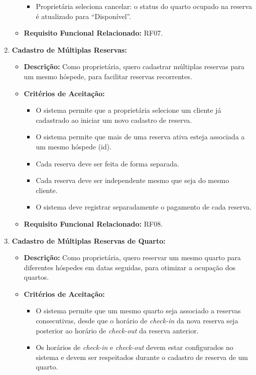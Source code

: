 \documentclass[
	12pt,				%
	openany,			%
	oneside,			%
	a4paper,			%
	english,			%
	french,				%
	spanish,			%
	brazil				%
	]{abntex2}
\begin{document}
\begin{enumerate}[label=\textbf{\arabic*.}]
\begin{itemize}
\begin{itemize}
			\item Proprietária seleciona cancelar: o status do quarto ocupado na reserva é atualizado para “Disponível”.
		\end{itemize}
		\item \textbf{Requisito Funcional Relacionado:} RF07.
	\end{itemize} 
	\item \textbf{Cadastro de Múltiplas Reservas:}
	\begin{itemize}
		\item \textbf{Descrição:} Como proprietária, quero cadastrar múltiplas reservas para um mesmo hóspede, para facilitar reservas recorrentes.
		\item \textbf{Critérios de Aceitação:}
		\begin{itemize}
			\item O sistema permite que a proprietária selecione um cliente já cadastrado ao iniciar um novo cadastro de reserva.
			\item O sistema permite que mais de uma reserva ativa esteja associada a um mesmo hóspede (id).
			\item Cada reserva deve ser feita de forma separada.
			\item Cada reserva deve ser independente mesmo que seja do mesmo cliente.
			\item O sistema deve registrar separadamente o pagamento de cada reserva.
		\end{itemize}
		\item \textbf{Requisito Funcional Relacionado:} RF08.
	\end{itemize} 
	\item \textbf{Cadastro de Múltiplas Reservas de Quarto:}
	\begin{itemize}
		\item \textbf{Descrição:} Como proprietária, quero reservar um mesmo quarto para diferentes hóspedes em datas seguidas, para otimizar a ocupação dos quartos.
		\item \textbf{Critérios de Aceitação:}
		\begin{itemize}
			\item O sistema permite que um mesmo quarto seja associado a reservas consecutivas, desde que o horário de \textit{check-in} da nova reserva seja posterior ao horário de \textit{check-out} da reserva anterior.
			\item Os horários de \textit{check-in} e \textit{check-out} devem estar configurados no sistema e devem ser respeitados durante o cadastro de reserva de um quarto.

\end{itemize}
\end{itemize}
\end{enumerate}
\end{document}
